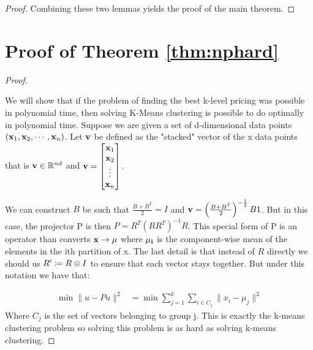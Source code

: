 \begin{proof}
    Combining these two lemmas yields the proof of the main theorem. 
    
\end{proof}


\section{Proof of Theorem \ref{thm:nphard}  }
\begin{proof}\label{proof:nphard}

    We will show that if the problem of finding the best k-level pricing was possible in polynomial time, then solving K-Means clustering is possible to do optimally in polynomial time. Suppose we are given a set of d-dimensional data points $(\mathbf{x}_1, \mathbf{x}_2, \cdots, \mathbf{x}_n)$. Let $\mathbf{v}$ be defined as the "stacked" vector of the x data points that is $\mathbf{v} \in \mathbb{R}^{nd}$ and $\mathbf{v} = \begin{bmatrix} \mathbf{x}_1 \\ \mathbf{x}_2 \\ \vdots \\ \mathbf{x}_n \end{bmatrix}$. 


    We can construct $B$ be such that $\frac{B+B^T}{2} = I$ and  $\mathbf{v} = \left( \frac{B+B^T}{2} \right)^{-\frac{1}{2}} B 1$.  But in this case, the projector P is then $P = R^T (RR^T)^{-1}R$. This special form of P is an operator than converts $\mathbf{x} \rightarrow \mathbf{\mu}$  where $\mathbf{\mu_i}$ is the component-wise mean of the elements in the ith partition of x. The last detail is that instead of $R$ directly we should us $R' \coloneqq R \otimes I$ to ensure that each vector stays together. But under this notation we have that:
    
    \begin{align*}
        \min \| u - P u \|^2 &= \min \sum_{j=1}^{k} \sum_{i \in C_j} \| x_i - \mu_j\|^2
    \end{align*}
    Where $C_j$ is the set of vectors belonging to group j. This is exactly the k-means clustering problem so solving this problem is as hard as solving k-means clustering. 
\end{proof}

